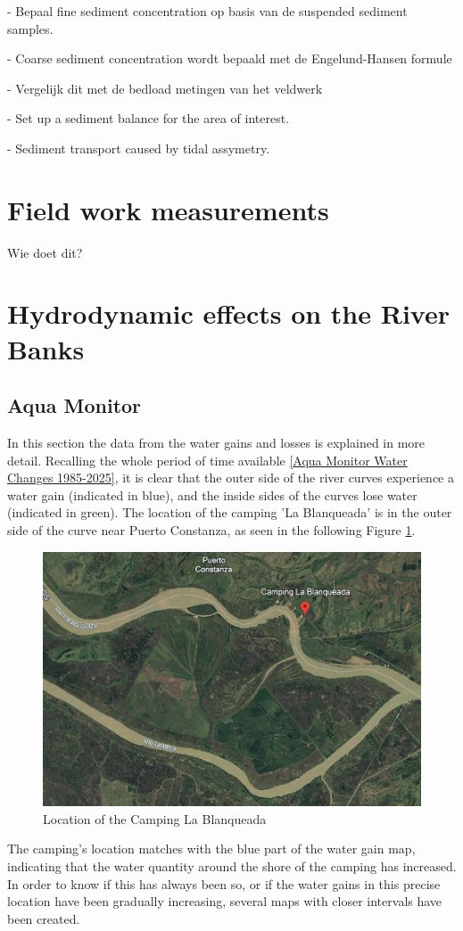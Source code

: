 - Bepaal fine sediment concentration op basis van de suspended sediment samples.

- Coarse sediment concentration wordt bepaald met de Engelund-Hansen formule

- Vergelijk dit met de bedload metingen van het veldwerk

- Set up a sediment balance for the area of interest.


- Sediment transport caused by tidal assymetry.


\section{Field work measurements}
Wie doet dit?

\section{Hydrodynamic effects on the River Banks}
\subsection{Aqua Monitor}
In this section the data from the water gains and losses is explained in more detail.
Recalling the whole period of time available \ref{Aqua Monitor Water Changes 1985-2025}, it is clear that the outer side of the river curves experience a water gain (indicated in blue), and the inside sides of the curves lose water (indicated in green). 
The location of the camping 'La Blanqueada' is in the outer side of the curve near Puerto Constanza, as seen in the following Figure \ref{fig:Camping Blanqueada}.

\begin{figure}
    \centering
    \includegraphics[width=0.5\linewidth]{figures/ch5/Camping Blanqueada.png}
    \caption{Location of the Camping La Blanqueada}
    \label{fig:Camping Blanqueada}
\end{figure}

The camping's location matches with the blue part of the water gain map, indicating that the water quantity around the shore of the camping has increased. 
In order to know if this has always been so, or if the water gains in this precise location have been gradually increasing, several maps with closer intervals have been created. 

